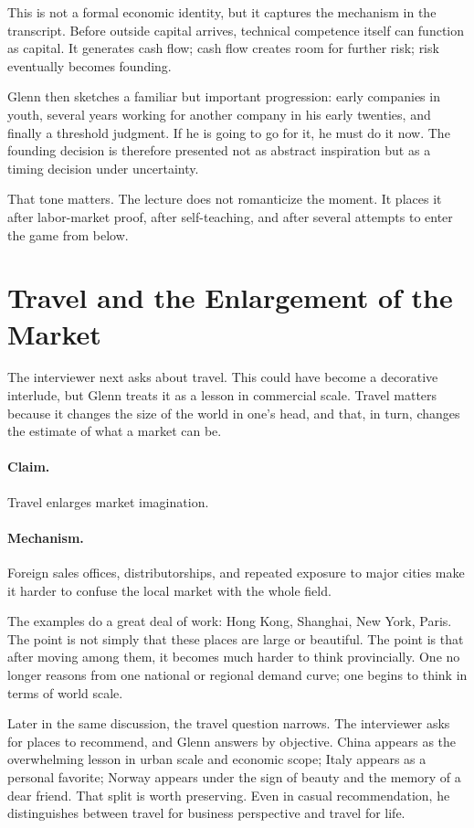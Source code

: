 This is not a formal economic identity, but it captures the mechanism in the transcript. Before outside capital arrives, technical competence itself can function as capital. It generates cash flow; cash flow creates room for further risk; risk eventually becomes founding.

Glenn then sketches a familiar but important progression: early companies in youth, several years working for another company in his early twenties, and finally a threshold judgment. If he is going to go for it, he must do it now. The founding decision is therefore presented not as abstract inspiration but as a timing decision under uncertainty.

That tone matters. The lecture does not romanticize the moment. It places it after labor-market proof, after self-teaching, and after several attempts to enter the game from below.

\section{Travel and the Enlargement of the Market}

The interviewer next asks about travel. This could have become a decorative interlude, but Glenn treats it as a lesson in commercial scale. Travel matters because it changes the size of the world in one's head, and that, in turn, changes the estimate of what a market can be.

\paragraph{Claim.} Travel enlarges market imagination.

\paragraph{Mechanism.} Foreign sales offices, distributorships, and repeated exposure to major cities make it harder to confuse the local market with the whole field.

The examples do a great deal of work: Hong Kong, Shanghai, New York, Paris. The point is not simply that these places are large or beautiful. The point is that after moving among them, it becomes much harder to think provincially. One no longer reasons from one national or regional demand curve; one begins to think in terms of world scale.

Later in the same discussion, the travel question narrows. The interviewer asks for places to recommend, and Glenn answers by objective. China appears as the overwhelming lesson in urban scale and economic scope; Italy appears as a personal favorite; Norway appears under the sign of beauty and the memory of a dear friend. That split is worth preserving. Even in casual recommendation, he distinguishes between travel for business perspective and travel for life.

